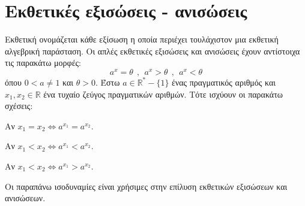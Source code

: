 \section{Εκθετικές εξισώσεις - ανισώσεις}
\orismoi
{}
Εκθετική ονομάζεται κάθε εξίσωση η οποία περιέχει τουλάχιστον μια εκθετική αλγεβρική παράσταση. Οι απλές εκθετικές εξισώσεις και ανισώσεις έχουν αντίστοιχα τις παρακάτω μορφές:
\[ a^x=\theta\ \ ,\ \ a^x>\theta\ \ ,\ \ a^x<\theta \]
όπου $ 0<a\neq1 $ και $ \theta>0 $.
\thewrhmata
{}
Έστω $ a\in\mathbb{R}^*-\{1\} $ ένας πραγματικός αριθμός και $ x_1,x_2\in\mathbb{R} $ ένα τυχαίο ζεύγος πραγματικών αριθμών. Τότε ισχύουν οι παρακάτω σχέσεις:
\begin{multicols}{2}
\begin{rlist}
\item Αν $ x_1=x_2\Leftrightarrow a^{x_1}=a^{x_2} $.
\item Αν $ x_1<x_2\Leftrightarrow a^{x_1}<a^{x_2} $.
\item Αν $ x_1<x_2\Leftrightarrow a^{x_1}>a^{x_2} $. 
\end{rlist}
\end{multicols}
Οι παραπάνω ισοδυναμίες είναι χρήσιμες στην επίλυση εκθετικών εξισώσεων και ανισώσεων.